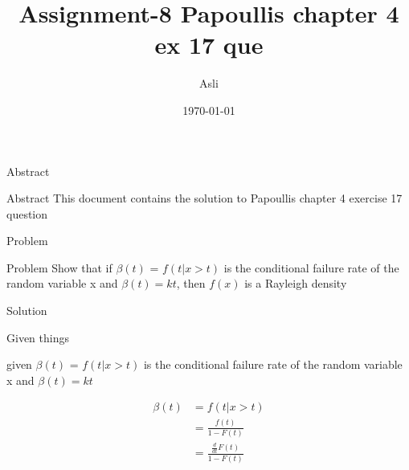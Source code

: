 \documentclass{beamer}
\title{ Assignment-8 Papoullis chapter 4 ex 17 que}
\author{Asli}
\institute{IIT Hyderabad}
\date{\today }
\begin{document}
\begin{frame}
      \titlepage
\end{frame}



\begin{frame}{Abstract}
     \begin{block}{Abstract}
          This document contains the solution to Papoullis chapter 4 exercise 17 question
      \end{block}
\end{frame}



\begin{frame}{Problem}

          \begin{block}{Problem}
              Show that if $\beta(t)$ = $f(t| x > t)$ is the conditional failure rate of the random variable x and $\beta(t) = kt $, then $f(x)$ is a Rayleigh density
           \end{block}

\end{frame}



\begin{frame}{Solution}

            \begin{block}{Given things}
                 
                    given $\beta(t)$ = $f(t| x > t)$ is the conditional failure rate of the random variable x and $\beta(t) = kt $
                  
                    \begin{align}
                         \beta(t) &= f(t| x > t) \\
                                  &= \frac{f(t)}{1 - F(t)} \\
                                  &= \frac{ \frac{d}{dt}F(t) }{1 - F(t)}
                                  \label{eq:form1}
                    \end{align}
                
            \end{block}
    
\end{frame}
\end{document}
